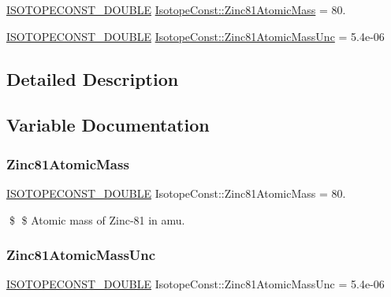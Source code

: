 \begin{DoxyCompactItemize}
\item 
\mbox{\hyperlink{group___isotope_const-_macros_ga8f45a7272ce02c0b4c65c44636ed719a}{I\+S\+O\+T\+O\+P\+E\+C\+O\+N\+S\+T\+\_\+\+D\+O\+U\+B\+LE}} \mbox{\hyperlink{group___isotope_const-_zinc-_zn81_gaf46038224d872e2e1712fdf10456e6b9}{Isotope\+Const\+::\+Zinc81\+Atomic\+Mass}} = 80.
\item 
\mbox{\hyperlink{group___isotope_const-_macros_ga8f45a7272ce02c0b4c65c44636ed719a}{I\+S\+O\+T\+O\+P\+E\+C\+O\+N\+S\+T\+\_\+\+D\+O\+U\+B\+LE}} \mbox{\hyperlink{group___isotope_const-_zinc-_zn81_gadf779496260e153ee27b709cc7b1c97b}{Isotope\+Const\+::\+Zinc81\+Atomic\+Mass\+Unc}} = 5.\+4e-\/06
\end{DoxyCompactItemize}


\subsection{Detailed Description}


\subsection{Variable Documentation}
\mbox{\label{group___isotope_const-_zinc-_zn81_gaf46038224d872e2e1712fdf10456e6b9}} 
\subsubsection{\texorpdfstring{Zinc81\+Atomic\+Mass}{Zinc81AtomicMass}}
{\footnotesize\ttfamily \mbox{\hyperlink{group___isotope_const-_macros_ga8f45a7272ce02c0b4c65c44636ed719a}{I\+S\+O\+T\+O\+P\+E\+C\+O\+N\+S\+T\+\_\+\+D\+O\+U\+B\+LE}} Isotope\+Const\+::\+Zinc81\+Atomic\+Mass = 80.}

\$ \$ Atomic mass of Zinc-\/81 in amu. \mbox{\label{group___isotope_const-_zinc-_zn81_gadf779496260e153ee27b709cc7b1c97b}} 
\subsubsection{\texorpdfstring{Zinc81\+Atomic\+Mass\+Unc}{Zinc81AtomicMassUnc}}
{\footnotesize\ttfamily \mbox{\hyperlink{group___isotope_const-_macros_ga8f45a7272ce02c0b4c65c44636ed719a}{I\+S\+O\+T\+O\+P\+E\+C\+O\+N\+S\+T\+\_\+\+D\+O\+U\+B\+LE}} Isotope\+Const\+::\+Zinc81\+Atomic\+Mass\+Unc = 5.\+4e-\/06}

